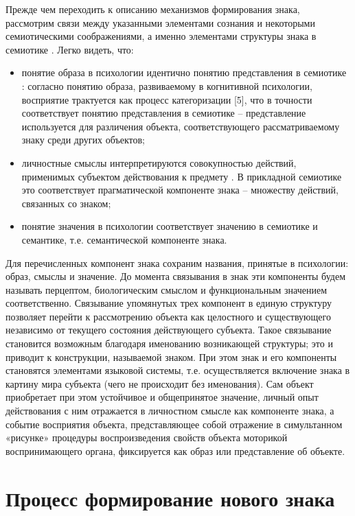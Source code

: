 Прежде чем переходить к описанию механизмов формирования знака, рассмотрим связи между указанными элементами сознания и некоторыми семиотическими соображениями, а именно элементами структуры знака в семиотике \cite{Pirs2000,Frege2000}. Легко видеть, что:
\begin{itemize}
	\item понятие образа в психологии идентично понятию представления в семиотике \cite{Frege2000}: согласно понятию образа, развиваемому в когнитивной психологии, восприятие трактуется как процесс категоризации [5], что в точности соответствует понятию представления в семиотике – представление используется для различения объекта, соответствующего рассматриваемому знаку среди других объектов;
	\item личностные смыслы интерпретируются совокупностью действий, применимых субъектом действования к предмету \cite{Leontiev1975}. В прикладной семиотике \cite{Pospelov2002} это соответствует прагматической компоненте знака – множеству действий, связанных со знаком;
	\item понятие значения в психологии соответствует значению в семиотике и семантике, т.е. семантической компоненте знака.
\end{itemize}
Для перечисленных компонент знака сохраним названия, принятые в психологии: образ, смыслы и значение. До момента связывания в знак эти компоненты будем называть перцептом, биологическим смыслом и функциональным значением соответственно. Связывание упомянутых трех компонент в единую структуру позволяет перейти к рассмотрению объекта как целостного и существующего независимо от текущего состояния действующего субъекта. Такое связывание становится возможным благодаря именованию возникающей структуры; это и приводит к конструкции, называемой знаком.
При этом знак и его компоненты становятся элементами языковой системы, т.е. осуществляется включение знака в картину мира субъекта (чего не происходит без именования). Сам объект приобретает при этом устойчивое и общепринятое значение, личный опыт действования с ним отражается в личностном смысле как компоненте знака, а событие восприятия объекта, представляющее собой отражение в симультанном «рисунке» процедуры воспроизведения свойств объекта моторикой воспринимающего органа, фиксируется как образ или представление об объекте.


\section{Процесс формирование нового знака} \label{sect2_2}

